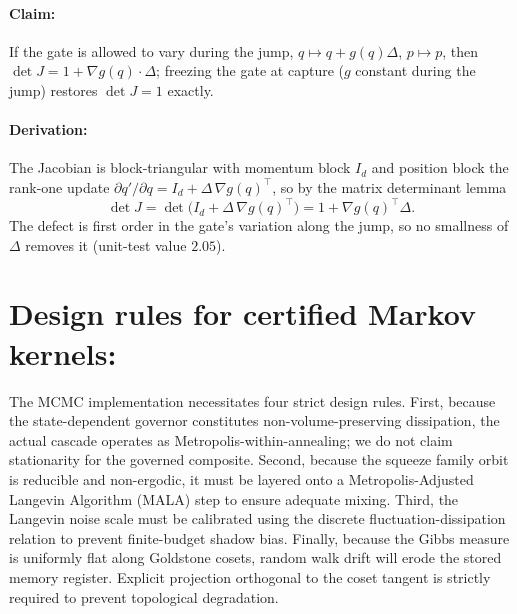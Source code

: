 \documentclass{article}
\newcommand{\detJ}{\det J}
\begin{document}
\paragraph{Claim:}
If the gate is allowed to vary during the jump, $q\mapsto q+g(q)\Delta$, $p\mapsto p$, then $\detJ=1+\nabla g(q)\cdot\Delta$; freezing the gate at capture ($g$ constant during the jump) restores $\detJ=1$ exactly.

\paragraph{Derivation:}
The Jacobian is block-triangular with momentum block $I_d$ and position block the rank-one update $\partial q'/\partial q=I_d+\Delta\,\nabla g(q)^\top$, so by the matrix determinant lemma
\[
\detJ=\det\bigl(I_d+\Delta\,\nabla g(q)^\top\bigr)=1+\nabla g(q)^\top\Delta.
\]
The defect is first order in the gate's variation along the jump, so no smallness of $\Delta$ removes it (unit-test value $2.05$).

\section{Design rules for certified Markov kernels:}
The MCMC implementation necessitates four strict design rules. First, because the state-dependent governor constitutes non-volume-preserving dissipation, the actual cascade operates as Metropolis-within-annealing; we do not claim stationarity for the governed composite. Second, because the squeeze family orbit is reducible and non-ergodic, it must be layered onto a Metropolis-Adjusted Langevin Algorithm (MALA) step \citep{roberts_exponential_1996} to ensure adequate mixing. Third, the Langevin noise scale must be calibrated using the discrete fluctuation-dissipation relation to prevent finite-budget shadow bias. Finally, because the Gibbs measure is uniformly flat along Goldstone cosets, random walk drift will erode the stored memory register. Explicit projection orthogonal to the coset tangent is strictly required to prevent topological degradation.
\end{document}
